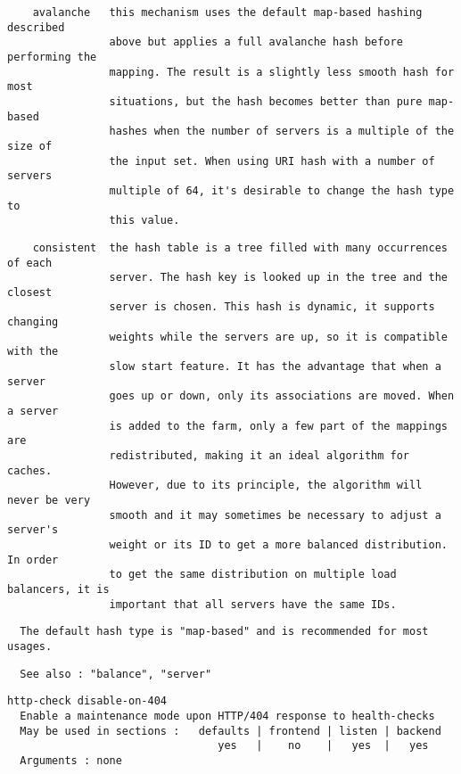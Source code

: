 \begin{verbatim}
    avalanche   this mechanism uses the default map-based hashing described
                above but applies a full avalanche hash before performing the
                mapping. The result is a slightly less smooth hash for most
                situations, but the hash becomes better than pure map-based
                hashes when the number of servers is a multiple of the size of
                the input set. When using URI hash with a number of servers
                multiple of 64, it's desirable to change the hash type to
                this value.
\end{verbatim}

\begin{verbatim}
    consistent  the hash table is a tree filled with many occurrences of each
                server. The hash key is looked up in the tree and the closest
                server is chosen. This hash is dynamic, it supports changing
                weights while the servers are up, so it is compatible with the
                slow start feature. It has the advantage that when a server
                goes up or down, only its associations are moved. When a server
                is added to the farm, only a few part of the mappings are
                redistributed, making it an ideal algorithm for caches.
                However, due to its principle, the algorithm will never be very
                smooth and it may sometimes be necessary to adjust a server's
                weight or its ID to get a more balanced distribution. In order
                to get the same distribution on multiple load balancers, it is
                important that all servers have the same IDs.
\end{verbatim}

\begin{verbatim}
  The default hash type is "map-based" and is recommended for most usages.
\end{verbatim}

\begin{verbatim}
  See also : "balance", "server"
\end{verbatim}

\begin{verbatim}
http-check disable-on-404
  Enable a maintenance mode upon HTTP/404 response to health-checks
  May be used in sections :   defaults | frontend | listen | backend
                                 yes   |    no    |   yes  |   yes
  Arguments : none
\end{verbatim}

